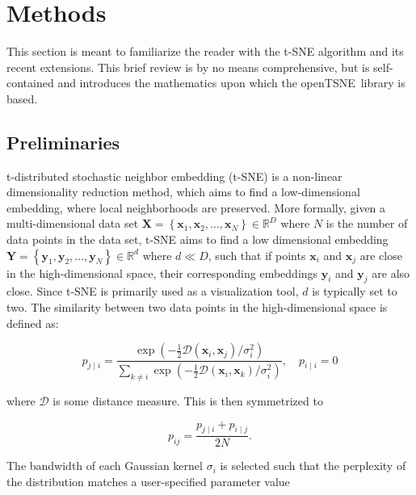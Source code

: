 \documentclass[twocolumn]{bmcart}
\newcommand{\opentsne}{\textsf{openTSNE}}
\begin{document}
\section*{Methods}

This section is meant to familiarize the reader with the t-SNE algorithm and its recent extensions. This brief review is by no means comprehensive, but is self-contained and introduces the mathematics upon which the \opentsne\ library is based.

\subsection*{Preliminaries}

t-distributed stochastic neighbor embedding (t-SNE) is a non-linear dimensionality reduction method, which aims to find a low-dimensional embedding, where local neighborhoods are preserved. More formally, given a multi-dimensional data set $\mathbf{X} = \left \{ \mathbf{x}_1,
\mathbf{x}_2, \dots, \mathbf{x}_N \right \} \in \mathbb{R}^D$ where $N$ is the
number of data points in the data set, t-SNE aims to find a low
dimensional embedding $\mathbf{Y} = \left \{ \mathbf{y}_1, \mathbf{y}_2, \dots,
\mathbf{y}_N \right \} \in \mathbb{R}^d$ where $d \ll D$, such that if points
$\mathbf{x}_i$ and $\mathbf{x}_j$ are close in the high-dimensional space,
their corresponding embeddings $\mathbf{y}_i$ and $\mathbf{y}_j$ are also
close. Since t-SNE is primarily used as a visualization tool, $d$ is typically
set to two. The similarity between two data points in the high-dimensional space is defined as:

\begin{equation}
p_{j \mid i} = \frac{\exp \left ( -\frac{1}{2} \mathcal{D}(\mathbf{x}_i, \mathbf{x}_j ) / \sigma_i^2 \right )}
{\sum_{k \neq i } \exp \left ( -\frac{1}{2} \mathcal{D}(\mathbf{x}_i, \mathbf{x}_k ) / \sigma_i^2 \right )}, \quad p_{i \mid i} = 0
\label{eq:gaussian_kernel}
\end{equation}

\noindent where $\mathcal{D}$ is some distance measure. This is then symmetrized to

\begin{equation}
p_{ij} = \frac{p_{j \mid i} + p_{i \mid j}}{2N}.
\label{eq:symmetrize}
\end{equation}

The bandwidth of each Gaussian kernel $\sigma_i$ is selected such that the
perplexity of the distribution matches a user-specified parameter value
\end{document}
